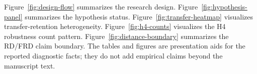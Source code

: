 \documentclass[12pt,a4paper]{article}
\begin{document}
Figure~\ref{fig:design-flow} summarizes the research design. Figure~\ref{fig:hypothesis-panel} summarizes the hypothesis status. Figure~\ref{fig:transfer-heatmap} visualizes transfer-retention heterogeneity. Figure~\ref{fig:h4-counts} visualizes the H4 robustness count pattern. Figure~\ref{fig:distance-boundary} summarizes the RD/FRD claim boundary. The tables and figures are presentation aids for the reported diagnostic facts; they do not add empirical claims beyond the manuscript text.
\end{document}
